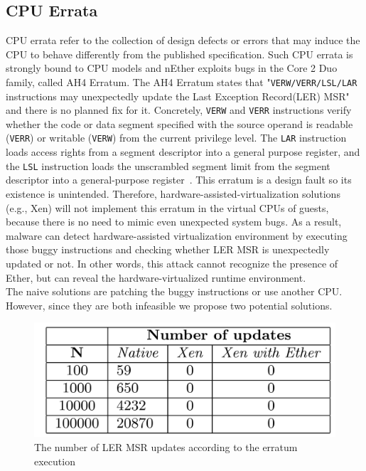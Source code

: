 \subsection{CPU Errata}
\label{sec:approach-errata}
CPU errata refer to the collection of design defects or errors that may induce the CPU to behave differently from the published specification. Such CPU errata is strongly bound to CPU models and nEther exploits bugs in the Core 2 Duo family, called AH4 Erratum. The AH4 Erratum states that "\texttt{VERW/VERR/LSL/LAR} instructions may unexpectedly update the Last Exception Record(LER) MSR" and there is no planned fix for it. Concretely, \texttt{VERW} and \texttt{VERR} instructions verify whether the code or data segment specified with the source operand is readable (\texttt{VERR}) or writable (\texttt{VERW}) from the current privilege level. The \texttt{LAR} instruction loads access rights from a segment descriptor into a general purpose register, and the \texttt{LSL} instruction loads the unscrambled segment limit from the segment descriptor into a general-purpose register~\cite{intelsys}. This erratum is a design fault so its existence is unintended. Therefore, hardware-assisted-virtualization solutions (e.g., Xen) will not implement this erratum in the virtual CPUs of guests, because there is no need to mimic even unexpected system bugs. As a result, malware can detect hardware-assisted virtualization environment by executing those buggy instructions and checking whether LER MSR is unexpectedly updated or not. In other words, this attack cannot recognize the presence of Ether, but can reveal the hardware-virtualized runtime environment. \\

The naive solutions are patching the buggy instructions or use another CPU. However, since they are both infeasible we propose two potential solutions.

\begin{figure}[!h]
	\centering
	\includegraphics[width=\linewidth]{figure/errata_table.png}
	\caption{The number of LER MSR updates according to the erratum execution}
	\label{fig:errata}
\end{figure}

